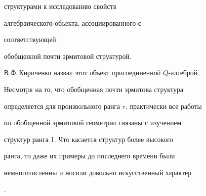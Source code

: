 структурами к исследованию свойств


алгебраического объекта, ассоциированного с


соответствующей


обобщенной почти эрмитовой структурой.


В.Ф.\,Кириченко назвал этот объект  присоединенной $Q$-алгеброй.



























Несмотря на то, что обобщенная почти эрмитова структура


определяется для произвольного ранга $r$, практически все работы


по обобщенной эрмитовой геометрии связаны с изучением


структур ранга 1. Что касается структур более высокого


ранга, то даже их примеры до последнего времени были


немногочисленны и носили довольно искусственный характер


\cite{KirVUZ}.


















